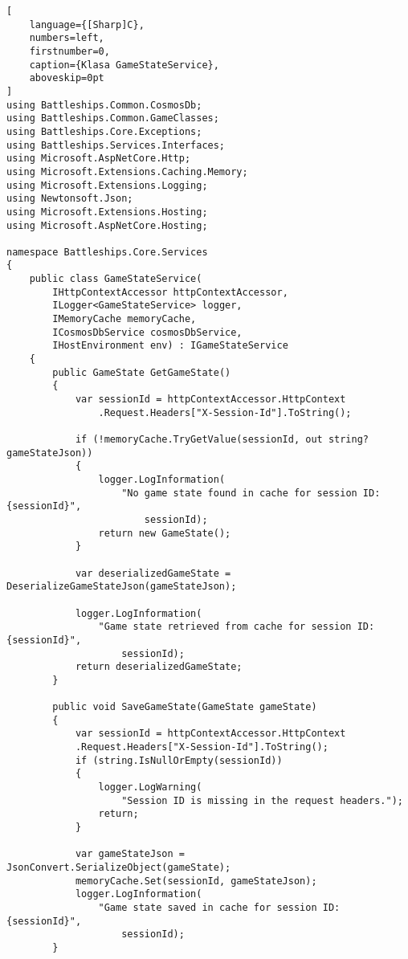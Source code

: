 \begin{addmargin}[0mm]{0mm}
\begin{lstlisting}[
    language={[Sharp]C},
    numbers=left,
    firstnumber=0,
    caption={Klasa GameStateService},
    aboveskip=0pt
]
using Battleships.Common.CosmosDb;
using Battleships.Common.GameClasses;
using Battleships.Core.Exceptions;
using Battleships.Services.Interfaces;
using Microsoft.AspNetCore.Http;
using Microsoft.Extensions.Caching.Memory;
using Microsoft.Extensions.Logging;
using Newtonsoft.Json;
using Microsoft.Extensions.Hosting;
using Microsoft.AspNetCore.Hosting;

namespace Battleships.Core.Services
{
    public class GameStateService(
        IHttpContextAccessor httpContextAccessor,
        ILogger<GameStateService> logger,
        IMemoryCache memoryCache,
        ICosmosDbService cosmosDbService,
        IHostEnvironment env) : IGameStateService
    {
        public GameState GetGameState()
        {
            var sessionId = httpContextAccessor.HttpContext
                .Request.Headers["X-Session-Id"].ToString();

            if (!memoryCache.TryGetValue(sessionId, out string? gameStateJson))
            {
                logger.LogInformation(
                    "No game state found in cache for session ID: {sessionId}",
                        sessionId);
                return new GameState();
            }           

            var deserializedGameState = DeserializeGameStateJson(gameStateJson);

            logger.LogInformation(
                "Game state retrieved from cache for session ID: {sessionId}",
                    sessionId);
            return deserializedGameState;
        }

        public void SaveGameState(GameState gameState)
        {
            var sessionId = httpContextAccessor.HttpContext
            .Request.Headers["X-Session-Id"].ToString();
            if (string.IsNullOrEmpty(sessionId))
            {
                logger.LogWarning(
                    "Session ID is missing in the request headers.");
                return;
            }

            var gameStateJson = JsonConvert.SerializeObject(gameState);
            memoryCache.Set(sessionId, gameStateJson);
            logger.LogInformation(
                "Game state saved in cache for session ID: {sessionId}",
                    sessionId);
        }


\end{lstlisting}
\end{addmargin}
